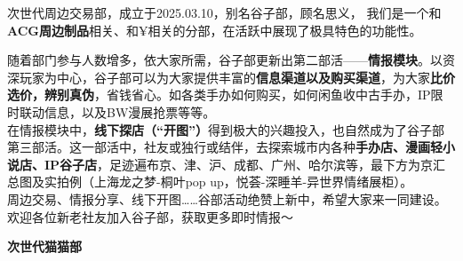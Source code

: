 \normalsize
\par
\vspace{0.5em}
\chind 次世代周边交易部，成立于2025.03.10，别名谷子部，顾名思义，
我们是一个和\textbf{ACG周边制品}相关、和¥相关的分部，在活跃中展现了极具特色的功能性。
\hfill
{}
\par
\vspace{0.5em}
\chind 随着部门参与人数增多，依大家所需，谷子部更新出第二部活——\textbf{情报模块}。以资深玩家为中心，谷子部可以为大家提供丰富的\textbf{信息渠道以及购买渠道}，为大家\textbf{比价选价，辨别真伪}，省钱省心。如各类手办如何购买，如何闲鱼收中古手办，IP限时联动信息，以及BW漫展抢票等等。\\
\chind 在情报模块中，\textbf{线下探店（“开图”）}得到极大的兴趣投入，也自然成为了谷子部第三部活。这一部活中，社友或独行或结伴，去探索城市内各种\textbf{手办店、漫画轻小说店、IP谷子店}，足迹遍布京、津、沪、成都、广州、哈尔滨等，最下方为京汇总图及实拍例（上海龙之梦-桐叶pop up，悦荟-深睡羊-异世界情绪展柜）。\\
\chind 周边交易、情报分享、线下开图……谷部活动绝赞上新中，希望大家来一同建设。欢迎各位新老社友加入谷子部，获取更多即时情报～
\par
{}
\hfill
{}
\newpage
\fontsize{23pt}{24pt}\selectfont
\textbf{\textcolor{truepurple}{次世代猫猫部}}\\
\vspace{0.7em}


